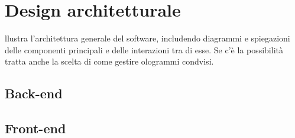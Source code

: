 \section{Design architetturale}\label{sec:design}
llustra l’architettura generale del software, includendo diagrammi e spiegazioni delle componenti principali e delle interazioni tra di esse. Se c’è la possibilità tratta anche la scelta di come gestire ologrammi condvisi.

\subsection{Back-end}\label{subsec:be}
\subsection{Front-end}\label{subsec:fe}